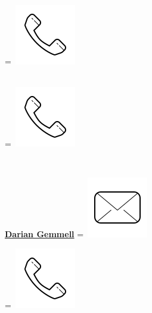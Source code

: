 \documentclass[]{latex/resume}
\begin{document}
\begin{minipage}[t]{0.25\textwidth}
    \begingroup
        =\hbox{
        \includegraphics[scale=0.1,trim={0 1.25cm -0.4cm 0cm}]{latex/icons/phone.png}\hspace{0.3cm}
        }
        \parbox{\wd0}{}
    \endgroup \\
    \begingroup
        =\hbox{
        \includegraphics[scale=0.1,trim={0 1.25cm -0.4cm 0cm}]{latex/icons/phone.png}\hspace{0.3cm}
        }
        \parbox{\wd0}{}
    \endgroup \\ 

    \sectionsep
    
    \href{https://www.linkedin.com}{\textbf{Darian Gemmell}} 
    \begingroup
        =\hbox{
            \includegraphics[scale=0.1,trim={0 1cm 0cm 0cm}]{latex/icons/mail.png} 
        }
        \parbox{\wd0}{}
    \endgroup
    \begingroup
        =\hbox{ \includegraphics[scale=0.1,trim={0 1.25cm -0.4cm 0cm}]{latex/icons/phone.png}\hspace{0.2cm} }
        \parbox{\wd0}{}
    \endgroup \\


\end{minipage}
\end{document}
